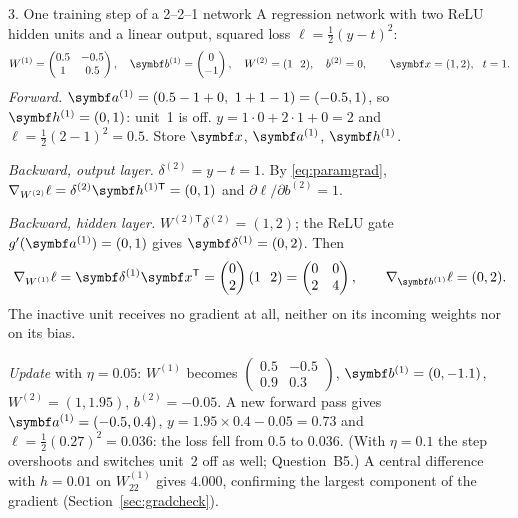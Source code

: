\documentclass[11pt]{article}
\newcommand{\av}{\vect{a}}
\newcommand{\hv}{\vect{h}}
\newcommand{\bv}{\vect{b}}
\newcommand{\dv}{\vect{\delta}}
\begin{document}
\begin{worked}{3. One training step of a 2--2--1 network}
A regression network with two ReLU hidden units and a linear output, squared loss $\ell = \frac12(y - t)^2$:
\[
  W^{(1)} = \begin{pmatrix} 0.5 & -0.5 \\ 1 & 0.5 \end{pmatrix}, \quad \bv^{(1)} = \begin{pmatrix} 0 \\ -1 \end{pmatrix},
  \quad W^{(2)} = (1 \ \ 2), \quad b^{(2)} = 0, \qquad \x = (1, 2), \ \ t = 1 .
\]
\emph{Forward.} $\av^{(1)} = (0.5 - 1 + 0,\ 1 + 1 - 1) = (-0.5, 1)$, so $\hv^{(1)} = (0, 1)$: unit~1 is off.
$y = 1\cdot 0 + 2\cdot 1 + 0 = 2$ and $\ell = \frac12(2 - 1)^2 = 0.5$. Store $\x$, $\av^{(1)}$, $\hv^{(1)}$.

\emph{Backward, output layer.} $\delta^{(2)} = y - t = 1$. By \eqref{eq:paramgrad}, $\nabla_{W^{(2)}}\ell =
\delta^{(2)}\hv^{(1)\mathsf{T}} = (0, 1)$ and $\partial\ell/\partial b^{(2)} = 1$.

\emph{Backward, hidden layer.} $W^{(2)\mathsf{T}}\delta^{(2)} = (1, 2)$; the ReLU gate $g'(\av^{(1)}) = (0, 1)$ gives
$\dv^{(1)} = (0, 2)$. Then
\[
  \nabla_{W^{(1)}}\ell = \dv^{(1)}\x\T = \begin{pmatrix} 0 \\ 2 \end{pmatrix}(1 \ \ 2) =
  \begin{pmatrix} 0 & 0 \\ 2 & 4 \end{pmatrix}, \qquad \nabla_{\bv^{(1)}}\ell = (0, 2) .
\]
The inactive unit receives no gradient at all, neither on its incoming weights nor on its bias.

\emph{Update} with $\eta = 0.05$: $W^{(1)}$ becomes $\begin{pmatrix} 0.5 & -0.5 \\ 0.9 & 0.3\end{pmatrix}$,
$\bv^{(1)} = (0, -1.1)$, $W^{(2)} = (1, 1.95)$, $b^{(2)} = -0.05$. A new forward pass gives $\av^{(1)} = (-0.5, 0.4)$,
$y = 1.95 \times 0.4 - 0.05 = 0.73$ and $\ell = \frac12(0.27)^2 = 0.036$: the loss fell from $0.5$ to $0.036$. (With
$\eta = 0.1$ the step overshoots and switches unit~2 off as well; Question~B5.) A central difference with $h = 0.01$
on $W^{(1)}_{22}$ gives $4.000$, confirming the largest component of the gradient (Section~\ref{sec:gradcheck}).
\end{worked}
\end{document}
